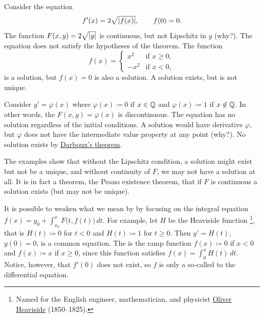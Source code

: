 \begin{example}
Consider the equation
\begin{equation*}
f'(x) = 2 \sqrt{\left\lvert {f(x)} \right\rvert}, \qquad f(0) = 0 .
\end{equation*}
The function $F(x,y) = 2 \sqrt{\left\lvert {y} \right\rvert}$ is continuous,
but not Lipschitz in $y$ (why?). 
The equation does not satisfy the hypotheses of the theorem.
The function
\begin{equation*}
f(x) =
\begin{cases}
x^2 & \text{if } x \geq 0,\\
-x^2 & \text{if } x < 0,
\end{cases}
\end{equation*}
is a solution, but $f(x) = 0$ is also a solution.
A solution exists, but is not unique.
\end{example}

\begin{example}
Consider $y' = \varphi(x)$ where $\varphi(x) \coloneqq 0$ if $x \in {\mathbb{Q}}$ and
$\varphi(x)\coloneqq 1$ if $x
\not\in {\mathbb{Q}}$.  In other words, the $F(x,y) = \varphi(x)$ is discontinuous.
The equation has no solution regardless of the initial
conditions.
A solution would have
derivative $\varphi$, but $\varphi$ does not have the intermediate value property
at any point (why?).  No solution exists by
\hyperref[thm:darboux]{Darboux's theorem}.
\end{example}

The examples show that without the Lipschitz condition, a solution might
exist but not be a unique, and without continuity of $F$, we may not
have a solution at all.
It is in fact a theorem, the Peano existence theorem, that if $F$ is
continuous a solution exists (but may not be unique).

\begin{remark}
It is possible to weaken what we mean by 
by focusing on the integral equation
$f(x) = y_0 + \int_{x_0}^x F\bigl(t,f(t)\bigr) \, dt$.  For example,
let $H$ be the
Heaviside function%
\footnote{Named
for the English engineer, mathematician, and physicist
\href{https://en.wikipedia.org/wiki/Oliver_Heaviside}{Oliver Heaviside}
(1850--1825).},
that is $H(t) \coloneqq 0$ for $t < 0$ and $H(t) \coloneqq 1$ for $t \geq 0$.
Then
$y' = H(t)$, $y(0) = 0$,
is a common equation.
The 
is the ramp function $f(x) \coloneqq 0$ if $x < 0$ and $f(x) \coloneqq x$ if $x \geq 0$,
since this function satisfies
$f(x) = \int_0^x H(t)\, dt$.  Notice, however, that $f'(0)$ does not exist,
so $f$ is only a so-called \emph{} to the
differential equation.
\end{remark}


